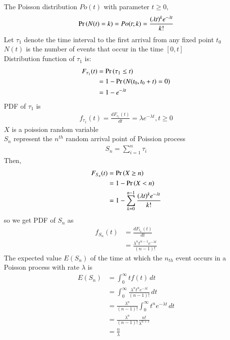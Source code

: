 \documentclass[journal,12pt,onecolumn]{IEEEtran}
\theoremstyle{remark}
\begin{document}
The Poisson distribution $Po(t)$ with parameter $t\geq 0$,\\
 \begin{align}
\Pr\left(N(t)=k\right)= Po(t;k)=\frac{(\lambda t)^k e^{-\lambda t}}{k!}    
\end{align}
Let $\tau_1 $ denote the time interval to the first arrival from any fixed point $t_0$\\
$N(t)$ is the number of events that occur in the time $[0,t]$\\
Distribution function of $\tau_1$ is:\\
\begin{align}
F_{\tau_1}(t)&=\Pr\left(\tau_1 \leq t\right) \\
&=1-\Pr\left(N(t_0,t_0+t)=0\right)\\
&=1-e^{-\lambda t}
\end{align}
PDF of $\tau_1 $ is
\begin{align}
f_{\tau_1} (t)=\frac{dF_{\tau_1} (t)}{dt}=\lambda e^{-\lambda t}, t\geq 0
\end{align}
$X$ is a poission random variable\\
$S_n$ represent the $n^{th}$ random arrival point of Poission process\\
\begin{align}
S_n=\sum_{i=1}^{n}\tau_i
\end{align}
Then,
\begin{align}
F_{S_n}(t)&=\Pr\left(X \geq n\right)\\
&=1-\Pr\left(X < n\right)\\
&=1-\sum_{k=0}^{n-1}\frac{(\lambda t)^k e^{-\lambda t}}{k!} 
\end{align}
 so we get PDF of $S_n$ as \\
\begin{align}
f_{S_n}(t)&=\frac{dF_{t_n} (t)}{dt}\\
&=\frac{\lambda^nt^{n-1}e^{-\lambda t}}{(n-1)!}
\end{align}
The expected value $E(S_n)$ of the time at which the $n_{th}$ event occurs in a Poisson process with rate $\lambda$ is\\
\begin{align}
E(S_n)&=\int_{0}^{\infty} tf(t) \, dt\\
&=\int_{0}^{\infty}\frac{\lambda^nt^ne^{-\lambda t}}{(n-1)!}\,dt \\
&=\frac{\lambda^n}{(n-1)!}\int_{0}^{\infty}t^ne^{-\lambda t} \,dt\\
&=\frac{\lambda^n}{(n-1)!}\frac{n!}{\lambda ^{n+1}}\\
&=\frac{n}{\lambda} \label{38/1}
\end{align}
\end{document}
